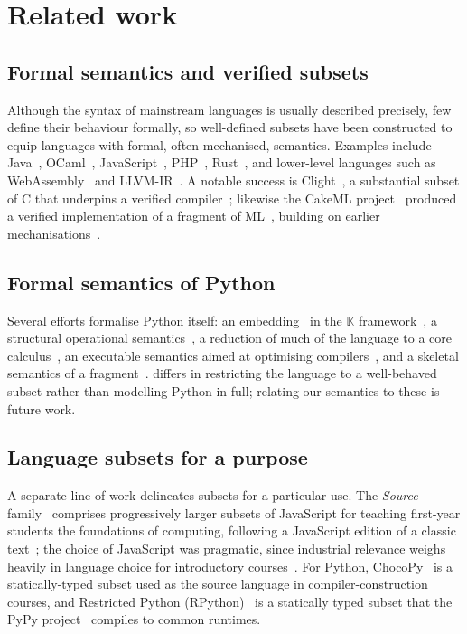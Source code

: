 \section{Related work}
\label{sec:related}

\subsection{Formal semantics and verified subsets}

Although the syntax of mainstream languages is usually described precisely, few define their behaviour
formally, so well-defined subsets have been constructed to equip languages with formal, often mechanised,
semantics. Examples include Java~\cite{igarashi2001}, OCaml~\cite{seassau2025},
JavaScript~\cite{bodin2014,guha2010,park2015,politz2012}, PHP~\cite{filaretti2014},
Rust~\cite{jung2020,jung2018}, and lower-level languages such as WebAssembly~\cite{watt2021a,watt2021,watt2023}
and LLVM-IR~\cite{zakowski2021,zhao2012}. A notable success is Clight~\cite{blazy2009}, a substantial subset of
C that underpins a verified compiler~\cite{leroy2009}; likewise the CakeML project~\cite{kumar2014} produced a
verified implementation of a fragment of ML~\cite{milner1997}, building on earlier mechanisations~\cite{lee2007}.

\subsection{Formal semantics of Python}

Several efforts formalise Python itself: an embedding~\cite{guth2013} in the $\mathbb{K}$
framework~\cite{rosu2010}, a structural operational semantics~\cite{kohl2021}, a reduction of much of the
language to a core calculus~\cite{politz2013}, an executable semantics aimed at optimising
compilers~\cite{melancon2023}, and a skeletal semantics of a fragment~\cite{andrieux}. \PurePy differs in
restricting the language to a well-behaved subset rather than modelling Python in full; relating our semantics
to these is future work.

\subsection{Language subsets for a purpose}

A separate line of work delineates subsets for a particular use. The \emph{Source} family~\cite{anderson2021}
comprises progressively larger subsets of JavaScript for teaching first-year students the foundations of
computing, following a JavaScript edition of a classic text~\cite{abelson2022}; the choice of JavaScript was
pragmatic, since industrial relevance weighs heavily in language choice for introductory
courses~\cite{simon2018}. For Python, ChocoPy~\cite{padhye2019} is a statically-typed subset used as the source
language in compiler-construction courses, and Restricted Python (RPython)~\cite{ancona2007} is a statically
typed subset that the PyPy project~\cite{rigo2006} compiles to common runtimes.

